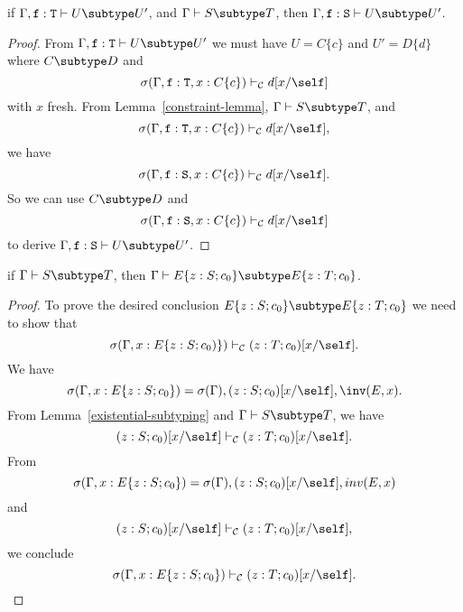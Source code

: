 \begin{lemma}
\label{subtype-lemma} %
if   $\Gamma, {\tt f}: {\tt T} \vdash U \subtype U'$,
and  $\Gamma \vdash S \subtype T$,
then $\Gamma, {\tt f}: {\tt S} \vdash U \subtype U'$.
\end{lemma}

\begin{proof}
From $\Gamma, {\tt f}: {\tt T} \vdash U \subtype U'$
we must have $U = C\{c\}$ and $U' = D\{d\}$
where
$C \subtype D$
and 
$$\sigma(\Gamma, {\tt f}: {\tt T}, x: C\{c\}) \vdash_{\cal C} d[x/\self]$$
with $x$ fresh.
From Lemma~\ref{constraint-lemma},
$\Gamma \vdash S \subtype T$,
and
$$\sigma(\Gamma, {\tt f}: {\tt T}, x: C\{c\}) \vdash_{\cal C} d[x/\self],$$
we have
$$\sigma(\Gamma, {\tt f}: {\tt S}, x: C\{c\}) \vdash_{\cal C} d[x/\self].$$
So we can use 
$C \subtype D$
and
$$\sigma(\Gamma, {\tt f}: {\tt S}, x: C\{c\}) \vdash_{\cal C} d[x/\self]$$
to derive 
$\Gamma, {\tt f}: {\tt S} \vdash U \subtype U'$.
\end{proof}

\begin{lemma}
\label{subtyping-in-existential-lemma} %
if   $\Gamma \vdash S \subtype T$,
then $\Gamma \vdash E\{z: S; c_0\} \subtype E\{z: T; c_0\}$.
\end{lemma}

\begin{proof}
To prove the desired conclusion $E\{z: S; c_0\} \subtype E\{z: T; c_0\}$ 
we need to show that
$$\sigma(\Gamma, x: E\{z: S; c_0)\}) \vdash_{\cal C} (z: T; c_0)[x/\self].$$
%
We have 
$$\sigma(\Gamma, x: E\{z: S; c_0\}) = 
 \sigma(\Gamma), (z: S; c_0)[x/\self], \inv(E,x).$$
From Lemma~\ref{existential-subtyping} and
$\Gamma \vdash S \subtype T$, 
we have
$$(z:S; c_0)[x/\self] \vdash_{\cal C} (z:T; c_0)[x/\self].$$
From $$\sigma(\Gamma, x: E\{z: S; c_0\}) =
 \sigma(\Gamma), (z: S; c_0)[x/\self], inv(E,x)$$
and
$$(z:S; c_0)[x/\self] \vdash_{\cal C} (z:T; c_0)[x/\self],$$
we conclude 
$$\sigma(\Gamma, x: E\{z: S; c_0\}) \vdash_{\cal C} (z: T; c_0)[x/\self].$$
\end{proof}

